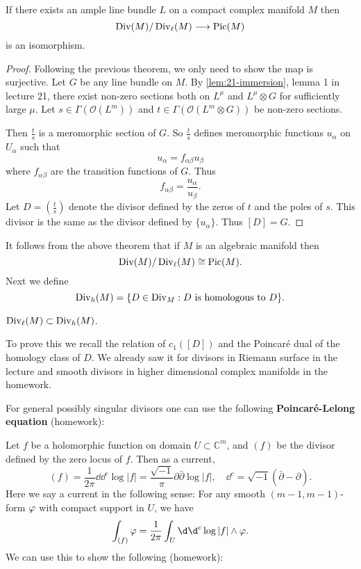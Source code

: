 \documentclass[12pt]{article}
\begin{document}
\begin{theorem}
  If there exists an ample line bundle \(L\) on a compact complex manifold \(M\) then
  \[
    \operatorname{Div}(M)/\operatorname{Div}_\ell(M)\longrightarrow \operatorname{Pic}(M)
  \] is an isomorphism.
\end{theorem}
\begin{proof}
  Following the previous theorem, we only need to show the map is surjective.
  Let \(G\) be any line bundle on \(M\). By 
  \ifdefined\FullBook \cref{lem:21-immersion},
  \else lemma 1 in lecture 21,
  \fi there exist non-zero sections both on \(L^\mu\) and \(L^\mu\otimes G\) for
  sufficiently large \(\mu\). Let \(s\in \Gamma(\mathcal{O}(L^m))\) and
  \(t\in \Gamma(\mathcal{O}(L^m\otimes G))\) be non-zero sections.

  Then \(\frac{t}{s}\) is a meromorphic section of \(G\). So \(\frac{t}{s}\) defines
  meromorphic functions \(u_\alpha\) on \(U_\alpha\) such that \[
    u_\alpha=f_{\alpha\beta}u_\beta
  \] where \(f_{\alpha\beta}\) are the transition functions of \(G\). Thus \[
    f_{\alpha\beta}=\frac{u_\alpha}{u_\beta}
  .\] Let \(D=(\frac{t}{s})\) denote the divisor defined by the zeros of \(t\) and
  the poles of \(s\). This divisor is the same as the divisor defined by
  \(\{u_\alpha\}\). Thus \([D]=G\).
\end{proof}

It follows from the above theorem that if \(M\) is an algebraic manifold then \[
  \operatorname{Div}(M)/\operatorname{Div}_{\ell}(M)\cong \operatorname{Pic}(M)
.\] Next we define \[
  \operatorname{Div}_h(M)=\{D\in \operatorname{Div}_M:D\text{ is homologous to }D\}
.\]
\begin{prop}
  \(\operatorname{Div}_\ell(M)\subset \operatorname{Div}_h(M)\).
\end{prop}
To prove this we recall the relation of \(c_1([D])\) and the Poincaré dual of the
homology class of \(D\). We already saw it for divisors in Riemann surface in the
lecture and smooth divisors in higher dimensional complex manifolds in the homework.

For general possibly singular divisors one can use the following 
\textbf{Poincaré-Lelong equation} (homework):

Let \(f\) be a holomorphic function on domain \(U\subset \mathbb{C}^m\), and
\((f)\) be the divisor defined by the zero locus of \(f\). Then as a current, \[
  (f)=\frac{1}{2\pi}\dd\dd^c \log|f|=\frac{\sqrt{-1}}{\pi}\partial\bar{\partial}
  \log|f|,\quad \dd^c=\sqrt{-1}(\bar{\partial}-\partial)
.\] Here we say a current in the following sense: For any smooth \((m-1,m-1)\)-form
\(\varphi\) with compact support in \(U\), we have \[
  \int_{(f)}\vphi=\frac{1}{2\pi}\int_{U}\dd\dd^c \log|f|\wedge\vphi
.\] We can use this to show the following (homework):
\end{document}
